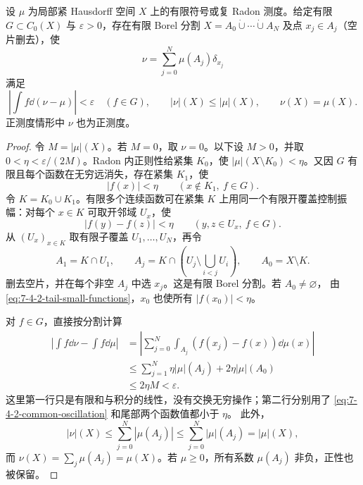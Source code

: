 \begin{theorem}[有限测试的确定性构造]\label{theorem:7-4-2-2}
设 $\mu$ 为局部紧 Hausdorff 空间 $X$ 上的有限符号或复 Radon 测度。给定有限
$G\subset C_0(X)$ 与 $\varepsilon>0$，存在有限 Borel 分割
$X=A_0\dot\cup\cdots\dot\cup A_N$ 及点 $x_j\in A_j$（空片删去），使
\[
 \nu=\sum_{j=0}^N\mu(A_j)\delta_{x_j}
\]
满足
\begin{equation}\label{eq:7-4-2-finite-test-error}
 \left|\int f\dd(\nu-\mu)\right|<\varepsilon\quad(f\in G),
 \qquad |\nu|(X)\le|\mu|(X),
 \qquad \nu(X)=\mu(X).
\end{equation}
正测度情形中 $\nu$ 也为正测度。
\end{theorem}

\begin{proof}
令 $M=|\mu|(X)$。若 $M=0$，取 $\nu=0$。以下设 $M>0$，并取
$0<\eta<\varepsilon/(2M)$。Radon 内正则性给紧集 $K_0$，使
$|\mu|(X\setminus K_0)<\eta$。又因 $G$ 有限且每个函数在无穷远消失，存在紧集 $K_1$，使
\begin{equation}\label{eq:7-4-2-tail-small-functions}
 |f(x)|<\eta\qquad(x\notin K_1,\ f\in G).
\end{equation}
令 $K=K_0\cup K_1$。有限多个连续函数可在紧集 $K$ 上用同一个有限开覆盖控制振幅：对每个
$x\in K$ 可取开邻域
$U_x$，使
\begin{equation}\label{eq:7-4-2-common-oscillation}
 |f(y)-f(z)|<\eta
 \qquad(y,z\in U_x,\ f\in G).
\end{equation}
从 $(U_x)_{x\in K}$ 取有限子覆盖 $U_1,\ldots,U_N$，再令
\[
 A_1=K\cap U_1,\qquad
 A_j=K\cap\left(U_j\setminus\bigcup_{i<j}U_i\right),\qquad
 A_0=X\setminus K.
\]
删去空片，并在每个非空 $A_j$ 中选 $x_j$。这是有限 Borel 分割。若 $A_0\ne\varnothing$，
由 \eqref{eq:7-4-2-tail-small-functions}，$x_0$ 也使所有 $|f(x_0)|<\eta$。

对 $f\in G$，直接按分割计算
\begin{align*}
 \left|\int f\dd\nu-\int f\dd\mu\right|
 &=\left|\sum_{j=0}^N\int_{A_j}(f(x_j)-f(x))\dd\mu(x)\right|\\
 &\le\sum_{j=1}^N\eta|\mu|(A_j)+2\eta|\mu|(A_0)\\
 &\le2\eta M<\varepsilon.
\end{align*}
这里第一行只是有限和与积分的线性，没有交换无穷操作；第二行分别用了
\eqref{eq:7-4-2-common-oscillation} 和尾部两个函数值都小于 $\eta$。
此外，
\[
 |\nu|(X)\le\sum_{j=0}^N|\mu(A_j)|
 \le\sum_{j=0}^N|\mu|(A_j)=|\mu|(X),
\]
而 $\nu(X)=\sum_j\mu(A_j)=\mu(X)$。若 $\mu\ge0$，所有系数 $\mu(A_j)$ 非负，正性也被保留。
\end{proof}

